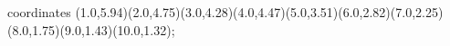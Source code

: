 					coordinates { (1.0,5.94)(2.0,4.75)(3.0,4.28)(4.0,4.47)(5.0,3.51)(6.0,2.82)(7.0,2.25)(8.0,1.75)(9.0,1.43)(10.0,1.32)};